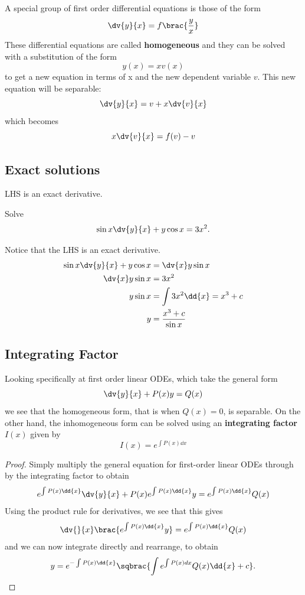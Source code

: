 A special group of first order differential equations is those of the form
\[ \dv{y}{x} = f\brac{\frac{y}{x}} \]
These differential equations are called \textbf{homogeneous} and they can be solved with a substitution
of the form
\[ y(x) = xv(x) \]
to get a new equation in terms of x and the new dependent variable $v$. This new equation will be
separable:
\[ \dv{y}{x} = v + x\dv{v}{x} \]
which becomes
\[ x\dv{v}{x} = f(v) - v \]

\subsection{Exact solutions}
LHS is an exact derivative.
\begin{exercise}
Solve 
\[ \sin x\dv{y}{x}+y\cos x=3x^2. \]
\end{exercise}

\begin{solution}
Notice that the LHS is an exact derivative.
\begin{align*}
\sin x\dv{y}{x}+y\cos x &= \dv{x}y\sin x \\
\dv{x}y\sin x &= 3x^2 \\
y \sin x &= \int 3x^2\dd{x} = x^3+c \\
y &= \frac{x^3+c}{\sin x}
\end{align*}
\end{solution}

\subsection{Integrating Factor}
Looking specifically at first order linear ODEs, which take the general form
\[ \dv{y}{x} + P(x)y = Q(x) \]
we see that the homogeneous form, that is when $Q(x)=0$, is separable. On the other hand, the inhomogeneous form can be solved using an \textbf{integrating factor} $I(x)$ given by
\[ I(x) = e^{\int P(x) \dd{x}} \]

\begin{proof}
Simply multiply the general equation for first-order linear ODEs through by the integrating factor to obtain
\[ e^{\int P(x) \dd{x}} \dv{y}{x} + P(x) e^{\int P(x) \dd{x}}y = e^{\int P(x) \dd{x}} Q(x) \]
Using the product rule for derivatives, we see that this gives
\[ \dv{}{x}\brac{e^{\int P(x) \dd{x}}y} = e^{\int P(x) \dd{x}} Q(x) \]
and we can now integrate directly and rearrange, to obtain
\[ y = e^{-\int P(x) \dd{x}} \sqbrac{\int e^{\int P(x)dx} Q(x) \dd{x} + c}. \]
\end{proof}

